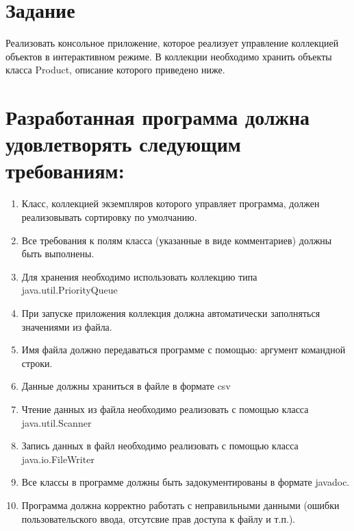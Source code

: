 \documentclass{article}
\begin{document}
\itmo[
  variant=74273,
  labn=1,
  discipline=Программирование,
  group=P3115,
  student=Владимир Мацюк,
  teacher=Кустарев Иван Павлович,
  year=2023,
  logo=../../../lib/img/itmo.png
]

\section*{Задание}

Реализовать консольное приложение, которое реализует управление коллекцией объектов в интерактивном режиме. В коллекции необходимо хранить объекты класса Product, описание которого приведено ниже.

\section*{Разработанная программа должна удовлетворять следующим требованиям:}
\begin{enumerate}
  \item Класс, коллекцией экземпляров которого управляет программа, должен реализовывать сортировку по умолчанию.
  \item Все требования к полям класса (указанные в виде комментариев) должны быть выполнены.
  \item Для хранения необходимо использовать коллекцию типа java.util.PriorityQueue
  \item При запуске приложения коллекция должна автоматически заполняться значениями из файла.
  \item Имя файла должно передаваться программе с помощью: аргумент командной строки.
  \item Данные должны храниться в файле в формате csv
  \item Чтение данных из файла необходимо реализовать с помощью класса java.util.Scanner
  \item Запись данных в файл необходимо реализовать с помощью класса java.io.FileWriter
  \item Все классы в программе должны быть задокументированы в формате javadoc.
  \item Программа должна корректно работать с неправильными данными (ошибки пользовательского ввода, отсутсвие прав доступа к файлу и т.п.).
\end{enumerate}
\end{document}

